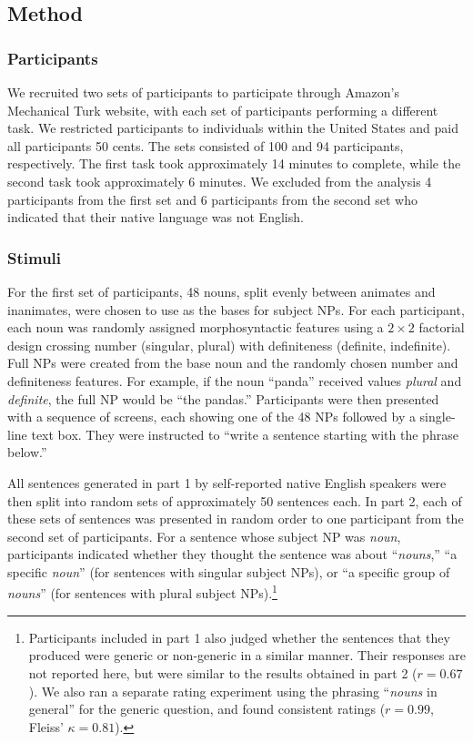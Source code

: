 \documentclass[10pt,letterpaper]{article}
\begin{document}
\subsection{Method}

\subsubsection{Participants}

We recruited two sets of participants to participate through Amazon's Mechanical Turk website, with each set of participants performing a different task. We restricted participants to individuals within the United States and paid all participants 50 cents. The sets consisted of 100 and 94 participants, respectively. The first task took approximately 14 minutes to complete, while the second task took approximately 6 minutes. We excluded from the analysis 4 participants from the first set and 6 participants from the second set who indicated that their native language was not English.

\subsubsection{Stimuli}

For the first set of participants, 48 nouns, split evenly between animates and inanimates, were chosen to use as the bases for subject NPs. For each participant, each noun was randomly assigned morphosyntactic features using a \(2 \times 2\) factorial design crossing number (singular, plural) with definiteness (definite, indefinite). Full NPs were created from the base noun and the randomly chosen number and definiteness features. For example, if the noun ``panda'' received values \textit{plural} and \textit{definite}, the full NP would be ``the pandas.'' Participants were then presented with a sequence of screens, each showing one of the 48 NPs followed by a single-line text box. They were instructed to ``write a sentence starting with the phrase below.''

All sentences generated in part 1 by self-reported native English speakers were then split into random sets of approximately 50 sentences each. In part 2, each of these sets of sentences was presented in random order to one participant from the second set of participants. For a sentence whose subject NP was \textit{noun}, participants indicated whether they thought the sentence was about ``\textit{nouns},'' ``a specific \textit{noun}'' (for sentences with singular subject NPs), or ``a specific group of \textit{nouns}'' (for sentences with plural subject NPs).\footnote{Participants included in part 1 also judged whether the sentences that they produced were generic or non-generic in a similar manner. Their responses are not reported here, but were similar to the results obtained in part 2 (\(r = 0.67\)). We also ran a separate rating experiment using the phrasing ``\textit{nouns} in general'' for the generic question, and found consistent ratings (\(r = 0.99\), Fleiss' \(\kappa = 0.81\)).}
\end{document}
